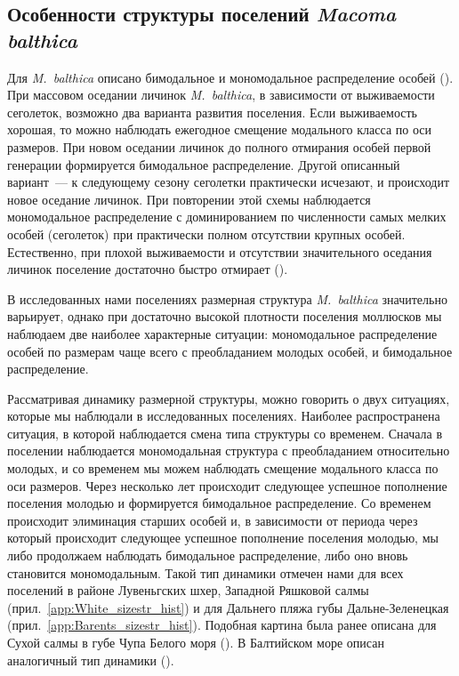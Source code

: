 	\subsection{Особенности структуры поселений {\it Macoma balthica}}
Для \textit{M.~balthica} описано бимодальное и мономодальное распределение особей (\cite{Segerstrale_1969, Maximovich_et_al_1991, Nikolaeva_1997, Nikolaeva_1998}). 
При массовом оседании личинок  \textit{M.~balthica}, в зависимости от выживаемости сеголеток, возможно два варианта развития поселения. 
Если выживаемость хорошая, то можно наблюдать ежегодное смещение модального класса по оси размеров. 
При новом оседании личинок до полного отмирания особей первой генерации формируется бимодальное распределение. 
Другой описанный вариант~--- к следующему сезону сеголетки практически исчезают, и происходит новое оседание личинок. 
При повторении этой схемы наблюдается мономодальное распределение с доминированием по численности самых мелких особей (сеголеток) при практически полном отсутствии крупных особей. Естественно, при плохой выживаемости и отсутствии значительного оседания личинок поселение достаточно быстро отмирает (\cite{Maximovich_et_al_1991}).

В исследованных нами поселениях размерная структура \textit{M.~balthica} значительно варьирует, однако при достаточно высокой плотности поселения моллюсков мы наблюдаем две наиболее характерные ситуации: мономодальное распределение особей по размерам чаще всего с преобладанием молодых особей, и бимодальное распределение.

Рассматривая динамику размерной структуры, можно говорить о  двух ситуациях, которые мы наблюдали в исследованных поселениях.
Наиболее распространена ситуация, в которой наблюдается смена типа структуры со временем. 
Сначала в поселении наблюдается мономодальная структура с преобладанием относительно молодых, и со временем мы можем наблюдать смещение модального класса по оси размеров. 
Через несколько лет происходит следующее успешное пополнение поселения молодью и формируется бимодальное распределение.
Со временем происходит элиминация старших особей и, в зависимости от периода через который происходит следующее успешное пополнение поселения молодью, мы либо продолжаем наблюдать бимодальное распределение, либо оно вновь становится мономодальным.
Такой тип динамики отмечен нами для всех поселений в районе Лувеньгских шхер, Западной Ряшковой салмы (прил.~\ref{app:White_sizestr_hist}) и для Дальнего пляжа губы Дальне-Зеленецкая (прил.~\ref{app:Barents_sizestr_hist}).
Подобная картина была ранее описана для Сухой салмы в губе Чупа Белого моря (\cite{Maximovich_et_al_1991}).
В Балтийском море описан аналогичный тип динамики (\cite{Segerstrale_1969}).

